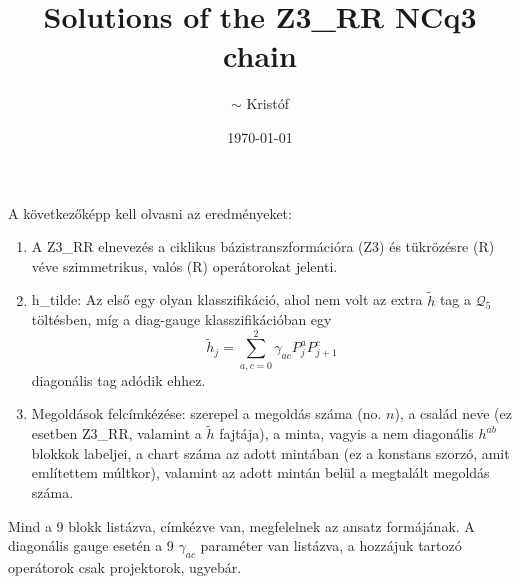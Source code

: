 \documentclass[a4paper, 11pt, twoside, onecolumn]{article}
\title{\Large{Solutions of the Z3\_RR NCq3 chain}}
\author{$\sim$ Kristóf}
\date{\today}
\newcommand{\qot}{\mathcal{Q}_5}
\newcommand{\htil}{\tilde{h}}
\begin{document}
\maketitle
\tableofcontents
\vspace{2cm}
A következőképp kell olvasni az eredményeket:
\begin{enumerate}
	\item A Z3_RR elnevezés a ciklikus bázistranszformációra (Z3) és tükrözésre (R) véve szimmetrikus, valós (R) operátorokat jelenti.
	\item h_tilde: Az első egy olyan klasszifikáció, ahol nem volt az extra $\htil$ tag a $\qot$ töltésben, míg a diag-gauge klasszifikációban egy 
	\begin{equation}
		\htil_j = \sum_{a,c=0}^2\gamma_{ac}P_j^aP_{j+1}^c
	\end{equation}
	diagonális tag adódik ehhez.
	\item Megoldások felcímkézése: szerepel a megoldás száma (no. $n$), a család neve (ez esetben Z3_RR, valamint a $\htil$ fajtája), a minta, vagyis a nem diagonális $h^{ab}$ blokkok labeljei, a chart száma az adott mintában (ez a konstans szorzó, amit említettem múltkor), valamint az adott mintán belül a megtalált megoldás száma.
\end{enumerate}
Mind a 9 blokk listázva, címkézve van, megfelelnek az ansatz formájának. A diagonális gauge esetén a 9 $\gamma_{ac}$ paraméter van listázva, a hozzájuk tartozó operátorok csak projektorok, ugyebár.
\end{document}
